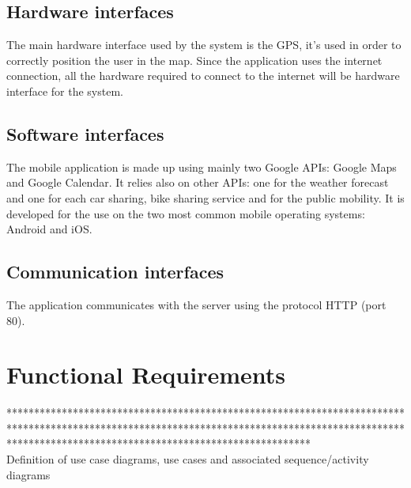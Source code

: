 \subsection{Hardware interfaces}
The main hardware interface used by the system is the GPS, it's used in order to correctly position the user in the map. Since the application uses the internet connection, all the hardware required to connect to the internet will be hardware interface for the system.
%
\subsection{Software interfaces}
The mobile application is made up using mainly two Google APIs: Google Maps and Google Calendar. It relies also on other APIs: one for the weather forecast and one for each car sharing, bike sharing service and for the public mobility.
It is developed for the use on the two most common mobile operating systems: Android and iOS.
%
\subsection{Communication interfaces}
The application communicates with the server using the protocol HTTP (port 80).
\section{Functional Requirements}
******************************************************************************************************************************************************************************************************* \\
Definition of use case diagrams, use cases and associated sequence/activity diagrams

